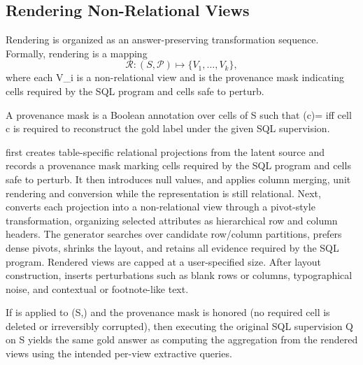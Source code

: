 \subsection{Rendering Non-Relational Views}
\label{subsec:transformations}
Rendering is organized as an answer-preserving transformation sequence. Formally, rendering is a mapping
\begin{equation}
    \mathcal{R} : (S,\mathcal{P}) \mapsto \{V_1,\dots,V_k\},
\end{equation}
where each V_i is a non-relational view and  is the provenance mask indicating cells required by the SQL program and cells safe to perturb.

\begin{definition}
A provenance mask  is a Boolean annotation over cells of S such that (c)= iff cell c is required to reconstruct the gold label under the given SQL supervision.
\end{definition}

\name first creates table-specific relational projections from the latent source and records a provenance mask marking cells required by the SQL program and cells safe to perturb. It then introduces null values, and applies column merging, unit rendering and conversion while the representation is still relational. Next, \name converts each projection into a non-relational view through a pivot-style transformation, organizing selected attributes as hierarchical row and column headers. The generator searches over candidate row/column partitions, prefers dense pivots, shrinks the layout, and retains all evidence required by the SQL program. Rendered views are capped at a user-specified size. After layout construction, \name inserts perturbations such as blank rows or columns, typographical noise, and contextual or footnote-like text.

\begin{proposition}
If  is applied to (S,) and the provenance mask  is honored (no required cell is deleted or irreversibly corrupted), then executing the original SQL supervision Q on S yields the same gold answer as computing the aggregation from the rendered views using the intended per-view extractive queries.
\end{proposition}

